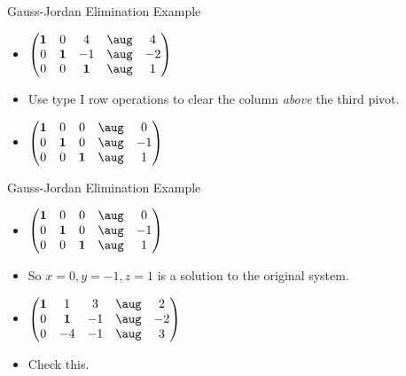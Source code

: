 \documentclass{beamer}
\begin{document}

\begin{frame}{Gauss-Jordan Elimination Example}

\begin{itemize}
\item $
\begin{pmatrix}
\bf{1} &            0    &             4    &  \aug &    4 \\
        0  &   \bf{ 1 }  &            -1    &  \aug &   -2  \\
        0  &            0    &   \bf{1}     &  \aug &    1  \\
\end{pmatrix}
$
\item Use type I row operations to clear the column \emph{above} the third pivot.
\item $
\begin{pmatrix}
\bf{1} &            0    &            0     &   \aug &    0  \\
        0  &   \bf{ 1 }  &            0     &   \aug &    -1  \\
        0  &            0    &    \bf{1}    &   \aug &    1   \\
\end{pmatrix}
$
\end{itemize}
\end{frame}


\begin{frame}{Gauss-Jordan Elimination Example}

\begin{itemize}
\item $
\begin{pmatrix}
\bf{1} &            0    &            0     &   \aug &    0  \\
        0  &   \bf{ 1 }  &            0     &   \aug &    -1  \\
        0  &            0    &    \bf{1}    &   \aug &    1   \\
\end{pmatrix}
$
\item So $x=0, y=-1, z=1$ is a solution to the original system.
\item $
\begin{pmatrix}
\bf{1} &            1    &    3    &  \aug &    2 \\
        0  &   \bf{ 1 }  &   -1    &  \aug &   -2  \\
        0  &            -4   &   -1    &  \aug &    3  \\
\end{pmatrix}
$
\item Check this.
\end{itemize}
\end{frame}
\end{document}

